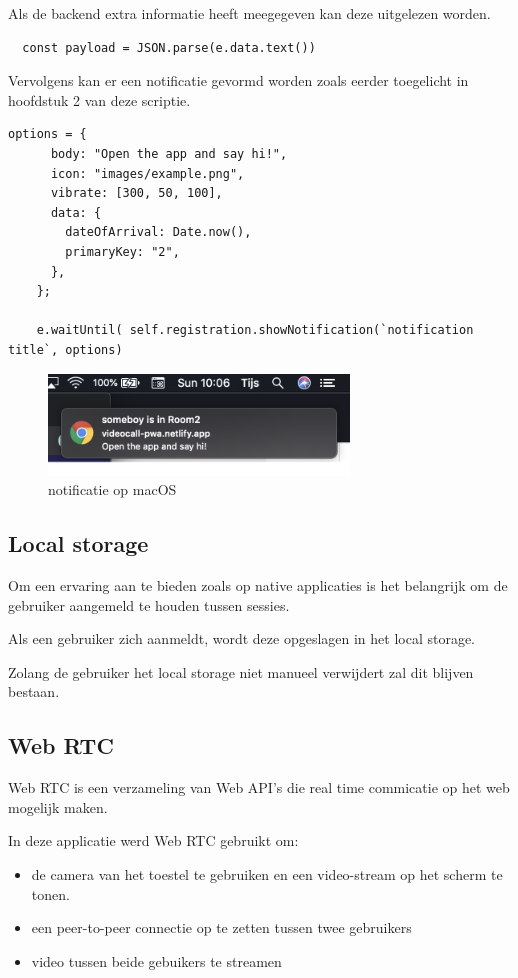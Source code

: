 			Als de backend extra informatie heeft meegegeven kan deze uitgelezen worden.
\begin{lstlisting}
  const payload = JSON.parse(e.data.text())
\end{lstlisting}
			
			Vervolgens kan er een notificatie gevormd worden zoals eerder toegelicht in hoofdstuk 2 van deze scriptie.
			
\begin{lstlisting}
options = {
      body: "Open the app and say hi!",
      icon: "images/example.png",
      vibrate: [300, 50, 100],
      data: {
        dateOfArrival: Date.now(),
        primaryKey: "2",
      },
    };

    e.waitUntil( self.registration.showNotification(`notification title`, options)
\end{lstlisting}

	\begin{figure}[H]
		\centering
		\includegraphics[width=80mm]{./img/notificationMacOs}{}		
		\caption{notificatie op macOS}
	\end{figure}
			
	\subsection{Local storage}
		
		Om een ervaring aan te bieden zoals op native applicaties is het belangrijk om de gebruiker aangemeld te houden tussen sessies.
		
		Als een gebruiker zich aanmeldt, wordt deze opgeslagen in het local storage.
		
		Zolang de gebruiker het local storage niet manueel verwijdert zal dit blijven bestaan. 
		\autocite{Mozilla2020d}
		
	\subsection{Web RTC}
		
		Web RTC is een verzameling van Web API's die real time commicatie op het web mogelijk maken. 
		
		In deze applicatie werd Web RTC gebruikt om:
		\begin{itemize}
			\item de camera van het toestel te gebruiken en een video-stream op het scherm te tonen.
			\item een peer-to-peer connectie op te zetten tussen twee gebruikers
			\item video tussen beide gebuikers te streamen
		\end{itemize} 
		\autocite{webRTC2020}
		
